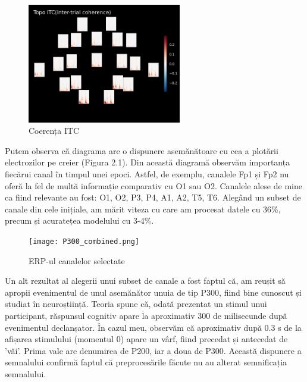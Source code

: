 \setlength{\abovecaptionskip}{0pt}
\setlength{\belowcaptionskip}{0pt}
\clearpage
\begin{figure}[h]
    \centering
    \includegraphics[width=0.6\textwidth]{images/itc_epochs.png}
    \caption{Coerența ITC}
    \label{fig:enter-label}
\end{figure}

Putem observa că diagrama are o dispunere asemănătoare cu cea a plotării electrozilor pe creier (Figura 2.1). Din această diagramă observăm importanța fiecărui canal în timpul unei epoci. Astfel, de exemplu, canalele Fp1 și Fp2 nu oferă la fel de multă informație comparativ cu O1 sau O2. Canalele alese de mine ca fiind relevante au fost: O1, O2, P3, P4, A1, A2, T5, T6. Alegând un subset de canale din cele inițiale, am mărit viteza cu care am procesat datele cu 36\%, precum și acuratețea modelului cu 3-4\%.

\vspace{1em}
\begin{figure}[!h]
    \centering
    \texttt{[image: P300\_combined.png]}
    \caption{ERP-ul canalelor selectate}
    \label{fig:enter-label}
\end{figure}

Un alt rezultat al alegerii unui subset de canale a fost faptul că, am reușit să apropii evenimentul de unul asemănător unuia de tip P300\cite{P300}, fiind bine cunoscut și studiat în neuroștiință. Teoria spune că, odată prezentat un stimul unui participant, răspunsul cognitiv apare la aproximativ 300 de milisecunde după evenimentul declanșator. În cazul meu, observăm că aproximativ după 0.3 s de la afișarea stimulului (momentul 0) apare un vârf, fiind precedat și antecedat de 'văi'. Prima vale are denumirea de P200, iar a doua de P300. Această dispunere a semnalului confirmă faptul că preprocesările făcute nu au alterat semnificația semnalului. %

